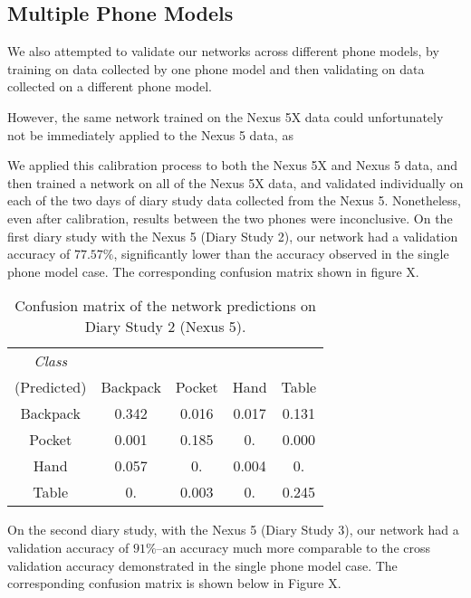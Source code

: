 \subsection{Multiple Phone Models}
We also attempted to validate our networks across different phone models, by training
on data collected by one phone model and then validating on data collected on a 
different phone model. 

However, the same network trained on the Nexus 5X data could unfortunately not be immediately
applied to the Nexus 5 data, as 

We applied this calibration process to both the Nexus 5X and Nexus 5 data, and then
trained a network on all of the Nexus 5X data, and validated individually on each of the 
two days of diary study data collected from the Nexus 5.
Nonetheless, even after calibration, results between the two phones were inconclusive. 
On the first diary study with the Nexus 5 (Diary Study 2), our network
had a validation accuracy of $77.57\%$, significantly lower than the accuracy observed
in the single phone model case. The corresponding confusion matrix shown in figure X.
\begin{table}[h]
\caption{Confusion matrix of the network predictions on Diary Study 2 (Nexus 5).}\label{fig:confusion} \centering
\begin{tabular}{| c || c | c | c | c }  
\toprule
\multicolumn{1}{c}{\textit{Class}}\multicolumn{4}{c}{(Actual)} \\ \cmidrule{1-5}
(Predicted)		&	Backpack    & 	Pocket 	& 	Hand	&	Table \\
\midrule
Backpack			&	0.342 	&	0.016	&	0.017 	&	0.131 \\
Pocket			&	0.001 	&	0.185 	&	0.	 	&	0.000 \\
Hand			&	0.057 	&	0.	 	&	0.004 	&	0. \\
Table			&	0. 		&	0.003 	&	0.	 	&	0.245\\
\bottomrule
\end{tabular}
\end{table}

On the second diary study, with the Nexus 5 (Diary Study 3), our network had a validation
accuracy of $91\%$--an accuracy much more comparable to the cross validation accuracy
demonstrated in the single phone model case. The corresponding confusion matrix is 
shown below in Figure X.

